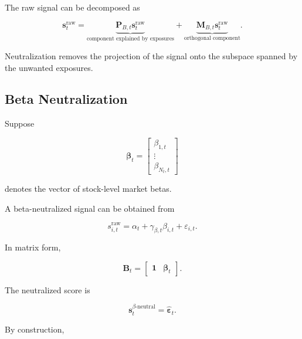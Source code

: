 \documentclass[11pt,a4paper]{article}
\begin{document}
The raw signal can be decomposed as

\begin{equation}
\boxed{
\mathbf{s}_t^{\mathrm{raw}}
=
\underbrace{
\mathbf{P}_{B,t}
\mathbf{s}_t^{\mathrm{raw}}
}_{\text{component explained by exposures}}
+
\underbrace{
\mathbf{M}_{B,t}
\mathbf{s}_t^{\mathrm{raw}}
}_{\text{orthogonal component}}.
}
\end{equation}

Neutralization removes the projection of the signal onto the subspace spanned
by the unwanted exposures.


\subsection{Beta Neutralization}
\label{subsec:signal_beta_neutralization}

Suppose

\begin{equation}
\boldsymbol{\beta}_t
=
\begin{bmatrix}
\beta_{1,t}
\\
\vdots
\\
\beta_{N_t,t}
\end{bmatrix}
\end{equation}

denotes the vector of stock-level market betas.

A beta-neutralized signal can be obtained from

\begin{equation}
\boxed{
s_{i,t}^{\mathrm{raw}}
=
\alpha_t
+
\gamma_{\beta,t}
\beta_{i,t}
+
\varepsilon_{i,t}.
}
\end{equation}

In matrix form,

\begin{equation}
\mathbf{B}_t
=
\begin{bmatrix}
\mathbf{1}
&
\boldsymbol{\beta}_t
\end{bmatrix}.
\end{equation}

The neutralized score is

\begin{equation}
\boxed{
\mathbf{s}_t^{\beta\text{-neutral}}
=
\widehat{\boldsymbol{\varepsilon}}_t.
}
\end{equation}

By construction,
\end{document}
